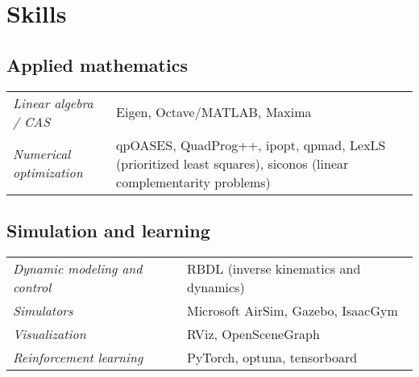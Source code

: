 \documentclass[a4paper,10pt]{report}
\begin{document}
\vspace{0.15cm}
\section{Skills}
\begin{adjustwidth}{0.5cm}{0pt}
%
\subsection{Applied mathematics}
\begin{adjustwidth}{0.5cm}{0pt}
    \begin{tabularx}{\linewidth}{l X}
        {\it Linear algebra / CAS}      &   Eigen, Octave/MATLAB, Maxima \\
        {\it Numerical optimization}    &   qpOASES, QuadProg++, ipopt, qpmad, LexLS (prioritized least squares),
                                            siconos (linear complementarity problems) \\
    \end{tabularx}
\end{adjustwidth}

\subsection{Simulation and learning}
\begin{adjustwidth}{0.5cm}{0pt}
    \begin{tabularx}{\linewidth}{l X}
        {\it Dynamic modeling and control}  & RBDL (inverse kinematics and dynamics) \\
        {\it Simulators}                    & Microsoft AirSim, Gazebo, IsaacGym \\
        {\it Visualization}                 & RViz, OpenSceneGraph \\
        {\it Reinforcement learning}        & PyTorch, optuna, tensorboard
    \end{tabularx}
\end{adjustwidth}


\end{adjustwidth}
\end{document}

